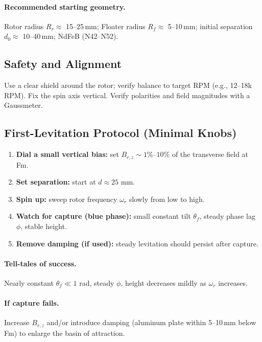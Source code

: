 \documentclass[11pt]{article}
\theoremstyle{definition}
\theoremstyle{plain}
\begin{document}
\paragraph{Recommended starting geometry.}
Rotor radius \(R_r\approx\) 15--25\,mm; Floater radius \(R_f\approx\) 5--10\,mm; initial separation \(d_0\approx\) 10--40\,mm; NdFeB (N42--N52).

\subsection{Safety and Alignment}
Use a clear shield around the rotor; verify balance to target RPM (e.g., 12--18k RPM). Fix the spin axis vertical. Verify polarities and field magnitudes with a Gaussmeter.

\subsection{First-Levitation Protocol (Minimal Knobs)}
\begin{enumerate}[leftmargin=1.5em]
  \item \textbf{Dial a small vertical bias:} set \(B_{r,z}\sim 1\%\)–\(10\%\) of the transverse field at Fm.
  \item \textbf{Set separation:} start at \(d\approx 25\) mm.
  \item \textbf{Spin up:} sweep rotor frequency \(\omega_r\) slowly from low to high.
  \item \textbf{Watch for capture (blue phase):} small constant tilt \(\theta_f\), steady phase lag \(\phi\), stable height.
  \item \textbf{Remove damping (if used):} steady levitation should persist after capture.
\end{enumerate}

\paragraph{Tell-tales of success.} Nearly constant \(\theta_f\ll 1\) rad, steady \(\phi\), height decreases mildly as \(\omega_r\) increases.

\paragraph{If capture fails.} Increase \(B_{r,z}\) and/or introduce damping (aluminum plate within 5--10\,mm below Fm) to enlarge the basin of attraction.
\end{document}
